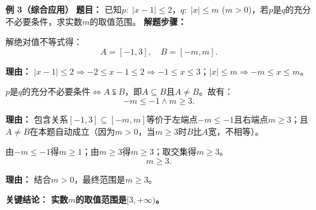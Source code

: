 \begin{examplebox}
	\medskip
	\textbf{\textcolor{CExample}{例 3（综合应用）}}
	\textbf{\textcolor{CExample}{题目：}}
	已知$p:\; |x-1|\le 2$，$q:\; |x|\le m$ ($m>0$)，若$p$是$q$的充分不必要条件，求实数$m$的取值范围。
	\textbf{\textcolor{CExample}{解题步骤：}}
	\begin{description}[style=nextline, leftmargin=2.8em, labelsep=0.5em, itemsep=0.45em]
		\item[\textbf{第一步（求集合）：}]
			解绝对值不等式得：
			\[
				A=[-1,3],\quad B=[-m,m].
			\]
			\par\textbf{理由：} $|x-1|\le2\Rightarrow -2\le x-1\le2\Rightarrow -1\le x\le3$；$|x|\le m\Rightarrow -m\le x\le m$。
		\item[\textbf{第二步（建包含关系）：}]
			$p$是$q$的充分不必要条件$\Leftrightarrow A\subsetneqq B$，即$A\subseteq B$且$A\neq B$。故有：
			\[
				-m\le -1 \land m\ge 3.
			\]
			\par\textbf{理由：} 包含关系$[-1,3]\subseteq[-m,m]$等价于左端点$-m\le -1$且右端点$m\ge 3$；且$A\neq B$在本题自动成立（因为$m>0$，当$m\ge3$时$B$比$A$宽，不相等）。
		\item[\textbf{第三步（解不等式）：}]
			由$-m\le -1$得$m\ge 1$；由$m\ge 3$得$m\ge 3$；取交集得$m\ge 3$。
			\[
				m\ge 3.
			\]
			\par\textbf{理由：} 结合$m>0$，最终范围是$m\ge3$。
	\end{description}
	\textbf{\textcolor{CExample}{关键结论：}}
	\textbf{实数$m$的取值范围是$[3,+\infty)$。}
\end{examplebox}
